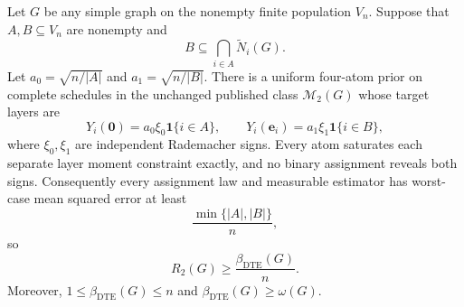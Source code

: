 Let \(G\) be any simple graph on the nonempty finite population \(V_n\).  Suppose that \(A,B\subseteq V_n\) are nonempty and
\[
B\subseteq\bigcap_{i\in A}\widetilde N_i(G).
\]
Let \(a_0=\sqrt{n/|A|}\) and \(a_1=\sqrt{n/|B|}\).  There is a uniform four-atom prior on complete schedules in the unchanged published class \(\mathcal M_2(G)\) whose target layers are
\[
Y_i(\mathbf 0)=a_0\xi_0\mathbf 1\{i\in A\},
\qquad
Y_i(\mathbf e_i)=a_1\xi_1\mathbf 1\{i\in B\},
\]
where \(\xi_0,\xi_1\) are independent Rademacher signs.  Every atom saturates each separate layer moment constraint exactly, and no binary assignment reveals both signs.  Consequently every assignment law and measurable estimator has worst-case mean squared error at least
\[
\frac{\min\{|A|,|B|\}}{n},
\]
so
\[
R_2(G)\geq\frac{\beta_{\mathrm{DTE}}(G)}{n}.
\]
Moreover, \(1\leq\beta_{\mathrm{DTE}}(G)\leq n\) and \(\beta_{\mathrm{DTE}}(G)\geq\omega(G)\).